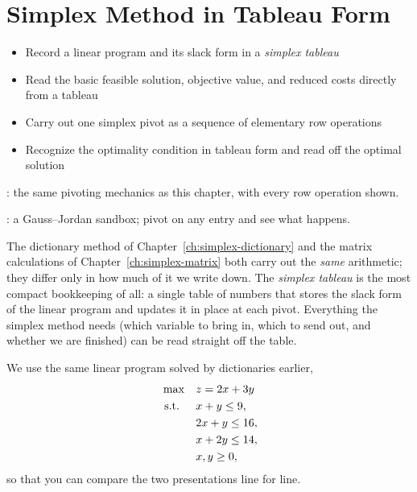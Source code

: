 
\chapter{Simplex Method in Tableau Form}
\label{ch:simplex-tableau}
\begin{outcome}
\begin{itemize}
\item Record a linear program and its slack form in a \emph{simplex tableau}
\item Read the basic feasible solution, objective value, and reduced costs directly from a tableau
\item Carry out one simplex pivot as a sequence of elementary row operations
\item Recognize the optimality condition in tableau form and read off the optimal solution
\end{itemize}
\end{outcome}

\begin{tryit}
: the same pivoting mechanics as this chapter, with every row operation shown.

: a Gauss--Jordan sandbox; pivot on any entry and see what happens.
\end{tryit}




The dictionary method of Chapter~\ref{ch:simplex-dictionary} and the matrix calculations of Chapter~\ref{ch:simplex-matrix} both carry out the \emph{same} arithmetic; they differ only in how much of it we write down. The \emph{simplex tableau} is the most compact bookkeeping of all: a single table of numbers that stores the slack form of the linear program and updates it in place at each pivot. Everything the simplex method needs (which variable to bring in, which to send out, and whether we are finished) can be read straight off the table.

We use the same linear program solved by dictionaries earlier,
\begin{equation*}
\begin{aligned}
\max\quad & z = 2x + 3y\\
\mbox{ s.t. }\quad  & x + y  \le 9,\\
          & 2x + y \le 16,\\
          & x + 2y \le 14,\\
          & x, y \ge 0,
\end{aligned}
\end{equation*}
so that you can compare the two presentations line for line.

